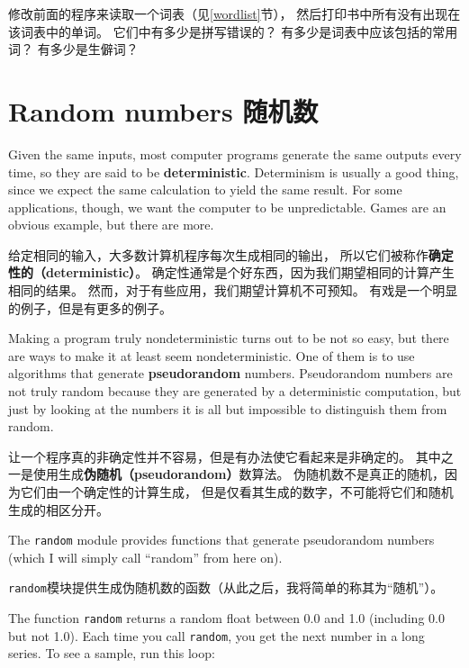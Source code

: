 \documentclass[10pt]{book}
\begin{document}
\begin{CJK}{UTF8}{gbsn}
\begin{exercise}
修改前面的程序来读取一个词表（见\ref{wordlist}节），
然后打印书中所有没有出现在该词表中的单词。
它们中有多少是拼写错误的？
有多少是词表中应该包括的常用词？
有多少是生僻词？

\end{exercise}


\section{Random numbers 随机数}

Given the same inputs, most computer programs generate the same
outputs every time, so they are said to be {\bf deterministic}.
Determinism is usually a good thing, since we expect the same
calculation to yield the same result.  For some applications, though,
we want the computer to be unpredictable.  Games are an obvious
example, but there are more.

给定相同的输入，大多数计算机程序每次生成相同的输出，
所以它们被称作{\bf 确定性的（deterministic）}。
确定性通常是个好东西，因为我们期望相同的计算产生相同的结果。
然而，对于有些应用，我们期望计算机不可预知。
有戏是一个明显的例子，但是有更多的例子。

Making a program truly nondeterministic turns out to be not so easy,
but there are ways to make it at least seem nondeterministic.  One of
them is to use algorithms that generate {\bf pseudorandom} numbers.
Pseudorandom numbers are not truly random because they are generated
by a deterministic computation, but just by looking at the numbers it
is all but impossible to distinguish them from random.

让一个程序真的非确定性并不容易，但是有办法使它看起来是非确定的。
其中之一是使用生成{\bf 伪随机（pseudorandom）}数算法。
伪随机数不是真正的随机，因为它们由一个确定性的计算生成，
但是仅看其生成的数字，不可能将它们和随机生成的相区分开。

The {\tt random} module provides functions that generate
pseudorandom numbers (which I will simply call ``random'' from
here on).

{\tt random}模块提供生成伪随机数的函数（从此之后，我将简单的称其为``随机''）。

The function {\tt random} returns a random float
between 0.0 and 1.0 (including 0.0 but not 1.0).  Each time you
call {\tt random}, you get the next number in a long series.  To see a
sample, run this loop:


\end{CJK}
\end{document}
